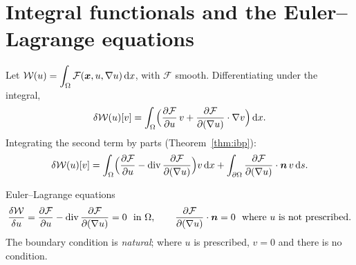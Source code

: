 \section{Integral functionals and the Euler--Lagrange equations}
Let $\displaystyle \mathcal W(u)=\int_\Omega\mathcal F(\bm{x},u,\nabla u)\,\mathrm{d} x$, with
$\mathcal F$ smooth. Differentiating under the integral,
\[
  \delta\mathcal W(u)[v]=\int_\Omega\Bigl(\frac{\partial\mathcal F}{\partial u}\,v
  +\frac{\partial\mathcal F}{\partial(\nabla u)}\cdot\nabla v\Bigr)\,\mathrm{d} x .
\]
Integrating the second term by parts (Theorem~\ref{thm:ibp}):
\[
  \delta\mathcal W(u)[v]=\int_\Omega\Bigl(\frac{\partial\mathcal F}{\partial u}
  -\operatorname{div}\frac{\partial\mathcal F}{\partial(\nabla u)}\Bigr)v\,\mathrm{d} x
  +\int_{\partial\Omega}\frac{\partial\mathcal F}{\partial(\nabla u)}\cdot\bm{n}\,v\,\mathrm{d} s .
\]
\begin{gbox}{Euler--Lagrange equations}
%
\begin{equation}\label{eq:EL}
  \frac{\delta\mathcal W}{\delta u}=\frac{\partial\mathcal F}{\partial u}
  -\operatorname{div}\frac{\partial\mathcal F}{\partial(\nabla u)}=0\ \ \text{in }\Omega,
  \qquad
  \frac{\partial\mathcal F}{\partial(\nabla u)}\cdot\bm{n}=0\ \ \text{where $u$ is not prescribed.}
\end{equation}
The boundary condition is \emph{natural}; where $u$ is prescribed, $v=0$ and
there is no condition.
\end{gbox}

